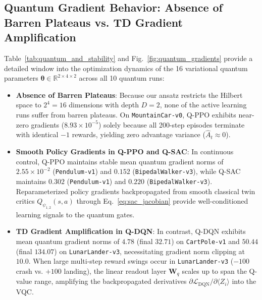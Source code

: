 \documentclass[conference]{IEEEtran}
\begin{document}
\subsection{Quantum Gradient Behavior: Absence of Barren Plateaus vs. TD Gradient Amplification}
Table~\ref{tab:quantum_and_stability} and Fig.~\ref{fig:quantum_gradients} provide a detailed window into the optimization dynamics of the 16 variational quantum parameters $\boldsymbol{\theta} \in \mathbb{R}^{2 \times 4 \times 2}$ across all 10 quantum runs:
\begin{itemize}
    \item \textbf{Absence of Barren Plateaus}: Because our ansatz restricts the Hilbert space to $2^4 = 16$ dimensions with depth $D=2$, none of the active learning runs suffer from barren plateaus. On \texttt{MountainCar-v0}, Q-PPO exhibits near-zero gradients ($8.93 \times 10^{-5}$) solely because all 200-step episodes terminate with identical $-1$ rewards, yielding zero advantage variance ($\hat{A}_t \approx 0$).
    \item \textbf{Smooth Policy Gradients in Q-PPO and Q-SAC}: In continuous control, Q-PPO maintains stable mean quantum gradient norms of $2.55 \times 10^{-2}$ (\texttt{Pendulum-v1}) and $0.152$ (\texttt{BipedalWalker-v3}), while Q-SAC maintains $0.302$ (\texttt{Pendulum-v1}) and $0.220$ (\texttt{BipedalWalker-v3}). Reparameterized policy gradients backpropagated from smooth classical twin critics $Q_{\psi_{1,2}}(s,a)$ through Eq.~\eqref{eq:sac_jacobian} provide well-conditioned learning signals to the quantum gates.
    \item \textbf{TD Gradient Amplification in Q-DQN}: In contrast, Q-DQN exhibits mean quantum gradient norms of $4.78$ (final $32.71$) on \texttt{CartPole-v1} and $50.44$ (final $134.07$) on \texttt{LunarLander-v3}, necessitating gradient norm clipping at $10.0$. When large multi-step reward swings occur in \texttt{LunarLander-v3} ($-100$ crash vs. $+100$ landing), the linear readout layer $\mathbf{W}_q$ scales up to span the Q-value range, amplifying the backpropagated derivatives $\partial \mathcal{L}_{\text{DQN}}/\partial \langle Z_i \rangle$ into the VQC.
\end{itemize}
\end{document}
